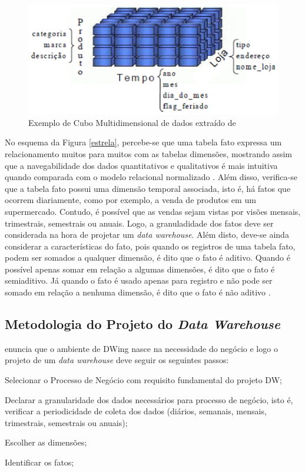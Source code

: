 \begin{figure}[h!]
\centering
\includegraphics[keepaspectratio=false,scale=0.85]{figuras/cube.eps}
\caption{Exemplo de Cubo Multidimensional de dados extraído de }
\label{cube}
\end{figure}
\FloatBarrier


No esquema da Figura \ref{estrela}, percebe-se que uma tabela fato expressa um relacionamento muitos para muitos com as tabelas dimensões, mostrando assim que a navegabilidade dos dados quantitativos e qualitativos é mais intuitiva quando comparada com o modelo relacional normalizado \cite{Kimball2002}. Além disso, verifica-se que a tabela fato possui uma dimensão temporal associada, isto é, há fatos que ocorrem diariamente, como por exemplo, a venda de produtos em um supermercado. Contudo, é possível que as vendas sejam vistas por visões mensais, trimestrais, semestrais ou anuais. Logo, a granuladidade dos fatos deve ser considerada na hora de projetar um \textit{data warehouse}. Além disto, deve-se ainda considerar a características do fato, pois quando os registros de uma tabela fato, podem ser somados a qualquer dimensão, é dito que o fato é aditivo. Quando é possível apenas somar em relação a algumas dimensões, é dito que o fato é semiaditivo. Já quando o fato é usado apenas para registro e não pode ser somado em relação a nenhuma dimensão, é dito que o fato é não aditivo \cite{Inmon1992}.

\subsection{Metodologia do Projeto do \textit{Data Warehouse}}

 enuncia que o ambiente de DWing nasce na necessidade do negócio e logo o projeto de um \textit{data warehouse} deve seguir os seguintes passos: 

\begin{inparaenum}[1)]
	\item Selecionar o Processo de Negócio com requisito fundamental do 
	projeto DW;
	
	\item Declarar a granularidade dos dados necessários para processo de 
	negócio, isto é, verificar a periodicidade de coleta dos dados (diários, semanais, mensais, trimestrais, semestrais ou anuais);
	
	\item Escolher as dimensões;
	
	\item Identificar os fatos;

\end{inparaenum} 


